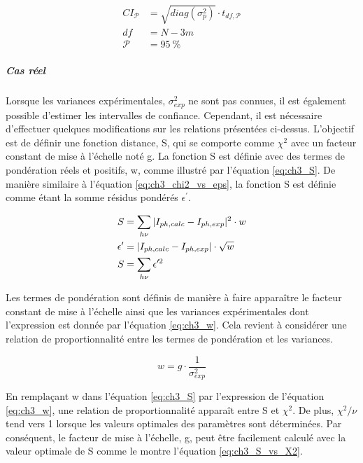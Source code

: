 \begin{refsection}
    \begin{equation}
        \begin{split}
            CI_{\mathcal{P}} &= \sqrt{diag(\sigma _p^2)} \cdot t_{df,\mathcal{P}}\\
            df &= N - 3m\\
            \mathcal{P} &= \SI{95}{\percent}
        \end{split}
        \label{eq:ch3_CI_parameters}
    \end{equation}

    \subparagraph{Cas réel}
    Lorsque les variances expérimentales, $\sigma _{exp}^2$ ne sont pas connues, il est également possible d'estimer
    les intervalles de confiance. Cependant, il est nécessaire d'effectuer quelques modifications sur les relations
    présentées ci-dessus. L'objectif est de définir une fonction distance, S, qui se comporte comme $\chi ^2$ avec un
    facteur constant de mise à l'échelle noté g. La fonction S est définie avec des termes de pondération réels et
    positifs, w, comme illustré par l'équation \ref{eq:ch3_S}.
    De manière similaire à l'équation \ref{eq:ch3_chi2_vs_eps}, la fonction S est définie comme étant la somme résidus
    pondérés $\epsilon ^{\prime}$.

    \begin{equation}
       \begin{split} 
            S &= \sum _{h\nu} \vert I_{ph,calc} - I_{ph,exp}\vert ^2 \cdot w \\
            \epsilon ^{\prime} &=  \vert I_{ph,calc} - I_{ph,exp} \vert \cdot \sqrt{w}\\
            S &= \sum _{h\nu} \epsilon ^{\prime 2} 
       \end{split}     
       \label{eq:ch3_S}
    \end{equation}

    Les termes de pondération sont définis de manière à faire apparaître le facteur constant de mise à l'échelle
    ainsi que les variances expérimentales dont l'expression est donnée par l'équation \ref{eq:ch3_w}. 
    Cela revient à considérer une relation de proportionnalité entre les termes de pondération et les variances.

    \begin{equation}
            w = g \cdot \frac{1}{\sigma _{exp} ^2}
            \label{eq:ch3_w}
    \end{equation}

    En remplaçant w dans l'équation \ref{eq:ch3_S} par l'expression de l'équation \ref{eq:ch3_w}, une relation de
    proportionnalité apparaît entre S et $\chi^2$. 
    De plus, $\chi^2/\nu$ tend vers 1 lorsque les valeurs optimales des paramètres sont déterminées.
    Par conséquent, le facteur de mise à l'échelle, g, peut être facilement
    calculé avec la valeur optimale de S comme le montre l'équation \ref{eq:ch3_S_vs_X2}. 


\end{refsection}
